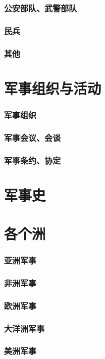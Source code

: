 \documentclass[UTF8]{../ApplicationUniverse}
\begin{document}
    \subsubsection{公安部队、武警部队}
    \subsubsection{民兵}
    \subsubsection{其他}
\section{军事组织与活动}
    \subsubsection{军事组织}
    \subsubsection{军事会议、会谈}
    \subsubsection{军事条约、协定}
\section{军事史}


\section{各个洲}

    \subsubsection{亚洲军事}
    \subsubsection{非洲军事}
    \subsubsection{欧洲军事}
    \subsubsection{大洋洲军事}
    \subsubsection{美洲军事}
\end{document}
